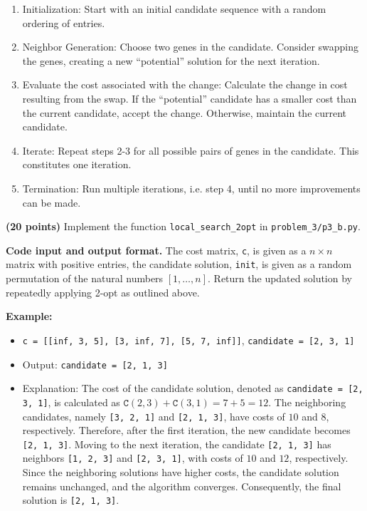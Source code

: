 \documentclass{hw}
\newcommand{\io}{\textbf{Code input and output format.} }
\begin{document}
\begin{problem}
\begin{subproblem}
\begin{enumerate}
    \item Initialization: Start with an initial candidate sequence with a random ordering of entries.
    \item Neighbor Generation: Choose two genes in the candidate. Consider swapping the genes, creating a new ``potential'' solution for the next iteration.
    \item Evaluate the cost associated with the change: Calculate the change in cost resulting from the swap. If the ``potential'' candidate has a smaller cost than the current candidate, accept the change. Otherwise, maintain the current candidate.
    \item Iterate: Repeat steps 2-3 for all possible pairs of genes in the candidate. This constitutes one iteration.
    \item Termination:
    Run multiple iterations, i.e. step 4, until no more improvements can be made.
\end{enumerate}
\end{subproblem}

\textbf{(20 points)} Implement the function \texttt{local\_search\_2opt} in \texttt{problem\_3/p3\_b.py}.

\io The cost matrix, \texttt{c}, is given as a $n \times n$ matrix with positive entries, the candidate solution, \texttt{init}, is given as a random permutation of the natural numbers $[1, \dots, n]$. Return the updated solution by repeatedly applying 2-opt as outlined above. 

\textbf{Example:}
\begin{itemize}
    \item \texttt{c = [[inf, 3, 5], [3, inf, 7], [5, 7, inf]]}, \texttt{candidate = [2, 3, 1]}
    \item Output: \texttt{candidate = [2, 1, 3]}
    \item Explanation: The cost of the candidate solution, denoted as \texttt{candidate = [2, 3, 1]}, is calculated as $\texttt{C}(2, 3) + \texttt{C}(3, 1) = 7 + 5 = 12$. The neighboring candidates, namely \texttt{[3, 2, 1]} and \texttt{[2, 1, 3]}, have costs of $10$ and $8$, respectively. Therefore, after the first iteration, the new candidate becomes \texttt{[2, 1, 3]}.
    Moving to the next iteration, the candidate \texttt{[2, 1, 3]} has neighbors \texttt{[1, 2, 3]} and \texttt{[2, 3, 1]}, with costs of $10$ and $12$, respectively. Since the neighboring solutions have higher costs, the candidate solution remains unchanged, and the algorithm converges. Consequently, the final solution is \texttt{[2, 1, 3]}.
\end{itemize}
\end{problem}
\end{document}
